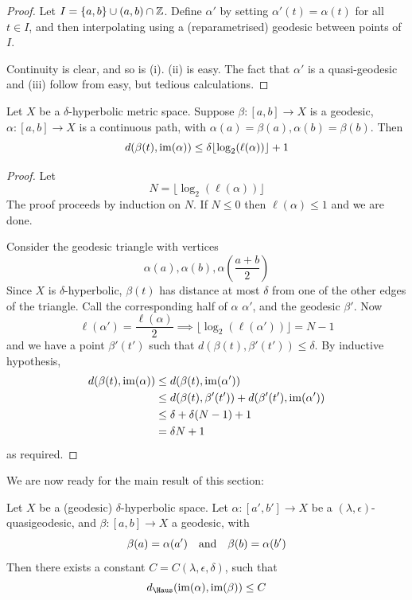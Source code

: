 \documentclass{article}
\begin{document}
\begin{proof}
    Let \(I = \{a, b\} \cup (a, b) \cap \mathbb{Z}\). Define \(\alpha'\) by setting \(\alpha'(t) = \alpha(t)\) for all \(t \in I\), and then interpolating using a (reparametrised) geodesic between points of \(I\).

    Continuity is clear, and so is (i). (ii) is easy. The fact that \(\alpha'\) is a quasi-geodesic and (iii) follow from easy, but tedious calculations.
\end{proof}

\begin{lemma}
    Let \(X\) be a \(\delta\)-hyperbolic metric space. Suppose \(\beta : [a, b] \to X\) is a geodesic, \(\alpha : [a, b] \to X\) is a continuous path, with \(\alpha(a) = \beta(a), \alpha(b) = \beta(b)\). Then
    \[d(\beta(t), \operatorname{im}(\alpha)) \le \delta\lfloor\log_2(\ell(\alpha))\rfloor + 1\]
\end{lemma}

\begin{proof}
    Let
    \[N = \lfloor \log_2(\ell(\alpha))\rfloor\]
    The proof proceeds by induction on \(N\). If \(N \le 0\) then \(\ell(\alpha) \le 1\) and we are done.

    Consider the geodesic triangle with vertices
    \[\alpha(a), \alpha(b), \alpha\!\!\left(\frac{a + b}{2}\right)\]
    Since \(X\) is \(\delta\)-hyperbolic, \(\beta(t)\) has distance at most \(\delta\) from one of the other edges of the triangle. Call the corresponding half of \(\alpha\) \(\alpha'\), and the geodesic \(\beta'\). Now
    \[\ell(\alpha') = \frac{\ell(\alpha)}{2} \implies \lfloor\log_2(\ell(\alpha'))\rfloor = N - 1\]
    and we have a point \(\beta'(t')\) such that \(d(\beta(t), \beta'(t')) \le \delta\). By inductive hypothesis,
    \begin{align*}
        d(\beta(t), \operatorname{im}(\alpha)) &\le d(\beta(t), \operatorname{im}(\alpha')) \\
        &\le d(\beta(t), \beta'(t')) + d(\beta'(t'), \operatorname{im}(\alpha')) \\
        &\le \delta + \delta(N - 1) + 1 \\
        &= \delta N + 1
    \end{align*}
    as required.
\end{proof}

We are now ready for the main result of this section:

\begin{theorem}
     Let \(X\) be a (geodesic) \(\delta\)-hyperbolic space. Let \(\alpha : [a', b'] \to X\) be a \((\lambda, \epsilon)\)-quasigeodesic, and \(\beta : [a, b] \to X\) a geodesic, with
    \[\beta(a) = \alpha(a') \qqtext{and}\beta(b) = \alpha(b')\]
    Then there exists a constant \(C = C(\lambda, \epsilon, \delta)\), such that
    \[d_\Haus(\im(\alpha), \im(\beta)) \le C\]
\end{theorem}
\end{document}
